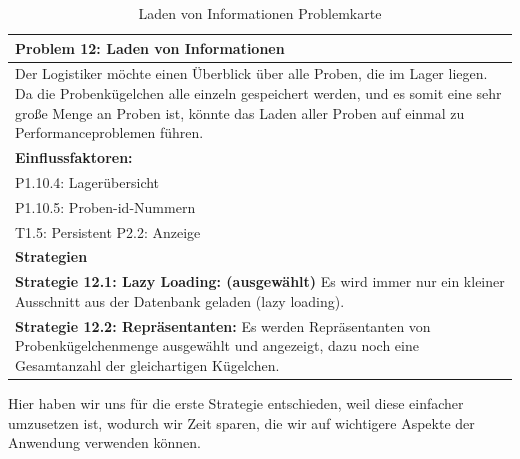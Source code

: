 \documentclass[enabledeprecatedfontcommands,fontsize=12pt,paper=a4,twoside]{scrartcl}
\begin{document}
\begin{table}[H]
    \centering
    \begin{tabular}{|p{15cm}|}
    \hline
          \textbf{Problem 12:} Laden von Informationen
          \\ \hline
          Der Logistiker möchte einen Überblick über alle Proben, die im Lager liegen. Da die Probenkügelchen alle einzeln gespeichert werden, und es somit eine sehr große Menge an Proben ist, könnte das Laden aller Proben auf einmal zu Performanceproblemen führen.
        \\  \hline
        \textbf{Einflussfaktoren: } \\
	 P1.10.4: Lagerübersicht \\
	P1.10.5: Proben-id-Nummern \\
	T1.5: Persistent
	P2.2: Anzeige \\
        \hline
        \textbf{Strategien} \\
  {}          
           \label{strategie:12.1}     
         \textbf{Strategie 12.1: Lazy Loading: (ausgewählt)} Es wird immer nur ein kleiner Ausschnitt aus der Datenbank geladen (lazy loading). \\
  {}          
           \label{strategie:12.2}     
         \textbf{Strategie 12.2: Repräsentanten:} Es werden Repräsentanten von Probenkügelchenmenge ausgewählt und angezeigt, dazu noch eine Gesamtanzahl der gleichartigen Kügelchen. \\ \hline
    \end{tabular}
    \caption{Laden von Informationen Problemkarte}
    \label{tab:ProblemKarte12}
\end{table}
Hier haben wir uns für die erste Strategie entschieden, weil diese einfacher umzusetzen ist, wodurch wir Zeit sparen, die wir auf wichtigere Aspekte der Anwendung verwenden können. 
\end{document}
